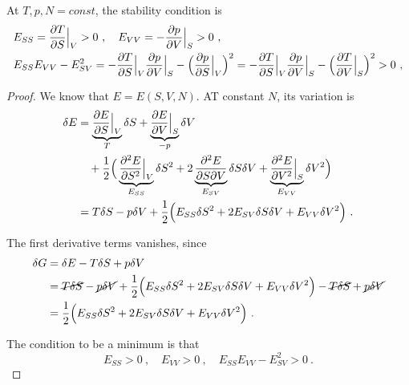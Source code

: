     At $T, p, N = const$, the stability condition is 
    \begin{equation}\label{stab}
    \begin{aligned}
        & E_{SS} = \frac{\partial T}{\partial S} \Big \vert_V > 0 ~, \quad E_{VV} = - \frac{\partial p}{\partial V} \Big \vert_S > 0 ~, \\ & E_{SS}E_{VV} - E^2_{SV} = - \frac{\partial T}{\partial S} \Big \vert_V \frac{\partial p}{\partial V} \Big \vert_S - \Big ( \frac{\partial p}{\partial S} \Big \vert_V \Big )^2 = - \frac{\partial T}{\partial S} \Big \vert_V \frac{\partial p}{\partial V} \Big \vert_S - \Big ( \frac{\partial T}{\partial V} \Big \vert_S \Big )^2 > 0 ~, 
    \end{aligned}
    \end{equation}
    \begin{proof}
        We know that $E = E(S, V, N)$. AT constant $N$, its variation is 
        \begin{equation*}
        \begin{aligned}
            \delta E & = \underbrace{\frac{\partial E}{\partial S} \Big \vert_V }_T \delta S + \underbrace{\frac{\partial E}{\partial V} \Big \vert_S}_{-p} \delta V  \\ & \quad + \frac{1}{2} \Big ( \underbrace{\frac{\partial^2 E}{\partial S^2} \Big \vert_V}_{E_{SS}} \delta S^2 + 2 \underbrace{\frac{\partial^2 E}{\partial S \partial V}}_{E_{SV}} \delta S \delta V + \underbrace{\frac{\partial^2 E}{\partial V^2} \Big \vert_S }_{E_{VV}} \delta V^2 \Big) \\ & = T \delta S - p \delta V + \frac{1}{2} \Big ( E_{SS} \delta S^2 + 2 E_{SV} \delta S \delta V + E_{VV} \delta V^2 \Big) ~.
        \end{aligned}
        \end{equation*}

        The first derivative terms vanishes, since 
        \begin{equation*}
        \begin{aligned}
            \delta G &= \delta E - T \delta S + p \delta V \\ & = \cancel{T \delta S} - \cancel{p \delta V} + \frac{1}{2} \Big ( E_{SS} \delta S^2 + 2 E_{SV} \delta S \delta V + E_{VV} \delta V^2 \Big) - \cancel{T \delta S} + \cancel{p \delta V} \\ & = \frac{1}{2} \Big ( E_{SS} \delta S^2 + 2 E_{SV} \delta S \delta V + E_{VV} \delta V^2 \Big) ~.
        \end{aligned}
        \end{equation*}

        The condition to be a minimum is that 
        \begin{equation*}
            E_{SS} > 0 ~, \quad E_{VV} > 0 ~, \quad E_{SS} E_{VV} - E_{SV}^2 > 0 ~.
        \end{equation*}


\end{proof}
